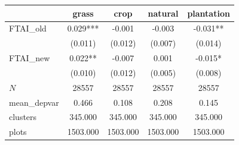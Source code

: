 {
\def\sym#1{\ifmmode^{#1}\else\(^{#1}\)\fi}
\begin{tabular}{l*{4}{c}}
\toprule
          &\multicolumn{1}{c}{grass}&\multicolumn{1}{c}{crop}&\multicolumn{1}{c}{natural}&\multicolumn{1}{c}{plantation}\\
\midrule
FTAI\_old  &    0.029***&   -0.001   &   -0.003   &   -0.031** \\
          &  (0.011)   &  (0.012)   &  (0.007)   &  (0.014)   \\
\addlinespace
FTAI\_new  &    0.022** &   -0.007   &    0.001   &   -0.015*  \\
          &  (0.010)   &  (0.012)   &  (0.005)   &  (0.008)   \\
\midrule
\(N\)     &    28557   &    28557   &    28557   &    28557   \\
mean\_depvar&    0.466   &    0.108   &    0.208   &    0.145   \\
clusters  &  345.000   &  345.000   &  345.000   &  345.000   \\
plots     & 1503.000   & 1503.000   & 1503.000   & 1503.000   \\
\bottomrule
\end{tabular}
}
